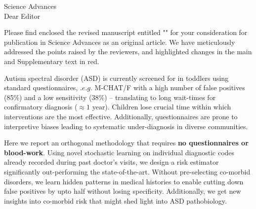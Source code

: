 \documentclass[9pt,onecolumn,compsoc]{IEEEtran}
\newcommand{\Space}{\vspace{10pt}}
\def\BEDITOR{Editor\xspace}
\def\JNAME{Science Advances\xspace}
\def\JADDR{}
\begin{document}
\parskip=12pt
\parindent=0pt
\Space
\Space
\fontsize{11}{12}\selectfont
\Space

\JNAME\\
\JADDR

Dear \BEDITOR

Please find enclosed the  revised manuscript entitled "\textbf{\TITLE}" for your consideration for publication in \JNAME as an original article. We have meticulously addressed the points raised by the reviewers, and highlighted changes in the main and Supplementary text in red.

Autism spectral disorder (ASD) is currently  screened for in toddlers using standard questionnaires, $.e.g.$ M-CHAT/F with a  high number of false positives (85\%) and  a low sensitivity (38\%) -- translating to long wait-times for confirmatory diagnosis ($\approx 1$ year). Children lose crucial time within which  interventions are the most effective.  Additionally, questionnaires are prone to interpretive biases leading to systematic under-diagnosis in diverse communities.  %

Here we report an orthogonal methodology that requires \textbf{no questionnaires or blood-work}. Using novel  stochastic learning on individual diagnostic codes already recorded during past doctor's visits, we design  a  risk estimator significantly out-performing the state-of-the-art. Without  pre-selecting co-morbid disorders, we learn hidden patterns in medical histories to enable cutting down false positives by upto half without losing specificity.
Additionally, we get new insights into co-morbid risk that might shed light into ASD pathobiology.

\end{document}
